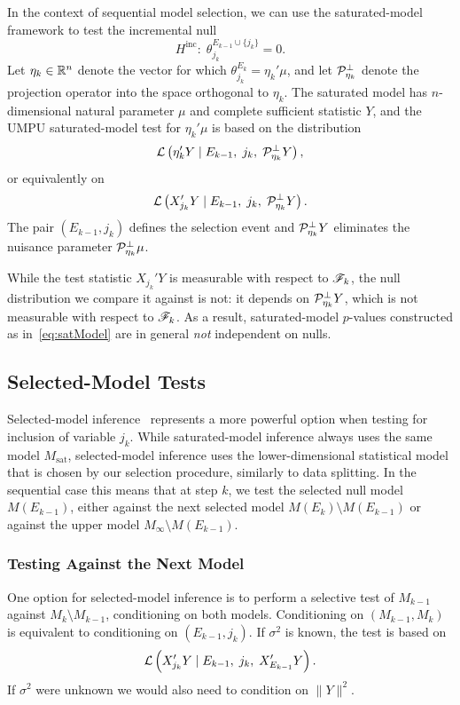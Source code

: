 \documentclass{article}
\begin{document}
In the context of sequential model selection, we can use the saturated-model framework to test the incremental null 
\[
H^{\text{inc}}:\; \theta_{j_k}^{E_{k-1}\cup \{j_k\}} = 0.
\]
Let $\eta_k\in \mathbb{R}^n$ denote the vector for which $\theta_{j_k}^{E_k} = \eta_k'\mu$, and let $\mathcal{P}_{\eta_k}^\perp$ denote the projection operator into the space orthogonal to $\eta_k$. The saturated model has $n$-dimensional natural parameter $\mu$ and complete sufficient statistic $Y$, and the UMPU saturated-model test for $\eta_k'\mu$ is based on the distribution
\begin{equation}\label{eq:satModel}
\mathcal{L}\left( \eta_k'Y \mid E_{k-1}, \;j_k, \;\mathcal{P}_{\eta_k}^\perp Y \right),
\end{equation}
or equivalently on
\begin{equation}\label{eq:satModelEquiv}
\mathcal{L}\left( X_{j_k}'Y \mid E_{k-1}, \;j_k, \;\mathcal{P}_{\eta_k}^\perp Y \right).
\end{equation}
The pair $(E_{k-1}, j_k)$ defines the selection event and $\mathcal{P}_{\eta_k}^\perp Y$ eliminates the nuisance parameter $\mathcal{P}_{\eta_k}^\perp \mu$.

While the test statistic $X_{j_k}'Y$ is measurable with respect to $\mathscr{F}_k$, the null distribution we compare it against is not: it depends on $\mathcal{P}_{\eta_k}^\perp Y$, which is not measurable with respect to $\mathscr{F}_k$. As a result, saturated-model $p$-values constructed as in~\eqref{eq:satModel} are in general {\em not} independent on nulls.

\subsection{Selected-Model Tests}
Selected-model inference~\citep{fithian2014optimal} 
represents a more powerful option when testing for inclusion of variable $j_k$. While saturated-model inference always uses the same model $M_{\text{sat}}$, selected-model inference uses the lower-dimensional statistical model that is chosen by our selection procedure, similarly to data splitting. In the sequential case this means that at step $k$, we test the selected null model $M(E_{k-1})$, either against the next selected model $M(E_k)\setminus M(E_{k-1})$ or against the upper model $M_\infty\setminus M(E_{k-1})$.

\subsubsection{Testing Against the Next Model}\label{sec:identify}
One option for selected-model inference is to perform a selective test of $M_{k-1}$ against $M_{k}\setminus M_{k-1}$, conditioning on both models. Conditioning on $(M_{k-1},M_k)$ is equivalent to conditioning on $(E_{k-1}, j_k)$. If $\sigma^2$ is known, the test is based on
\begin{equation}\label{eq:selModel_cond}
\mathcal{L}\left(X_{j_k}'Y \mid E_{k-1}, \; j_k, \; X_{E_{k-1}}'Y\right).
\end{equation}
If $\sigma^2$ were unknown we would also need to condition on $\|Y\|^2$.
\end{document}
